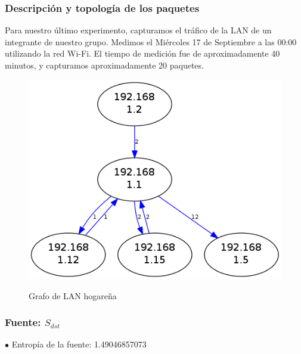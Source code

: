 \subsubsection{Descripción y topología de los paquetes}

Para nuestro último experimento, capturamos el tráfico de la LAN de un integrante de nuestro grupo. Medimos el Miércoles 17 de Septiembre a las 00:00 utilizando la red Wi-Fi. El tiempo de medición fue de aproximadamente 40 minutos, y capturamos aproximadamente 20 paquetes.

\begin{figure}[H]
  \begin{center}
    \includegraphics[width=\linewidth/2]{../imgs/pruebaFede-ips_red.png}
    \label{fig:FedeGrafo}
    \caption{Grafo de LAN hogareña}
  \end{center}
\end{figure}

\subsubsection{Fuente: $S_{dst}$}

$\bullet$ Entropía de la fuente: 1.49046857073

